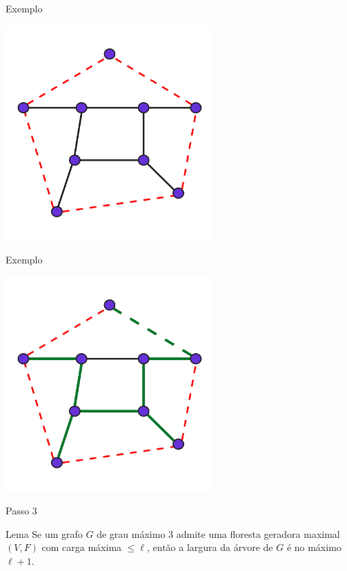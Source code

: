 \begin{frame}{Exemplo}
    \begin{minipage}{\linewidth}
        \centering
        \includegraphics[width=8cm]{images/proof_2_5.jpg}
    \end{minipage}
\end{frame}

\begin{frame}{Exemplo}
    \begin{minipage}{\linewidth}
        \centering
        \includegraphics[width=8cm]{images/proof_2_6.jpg}
    \end{minipage}
\end{frame}

\begin{frame}{Passo 3}
    \begin{block}{Lema}
        Se um grafo $G$ de grau máximo 3 admite uma floresta geradora maximal $(V, F)$ com carga máxima $\leq \ell$, então a largura da árvore de $G$ é no máximo $\ell + 1$.
    \end{block}
\end{frame}

